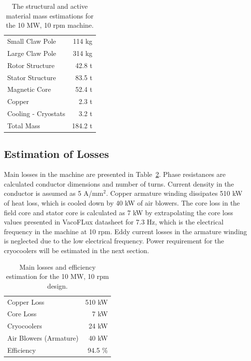 \documentclass[12pt]{iopart}
\begin{document}
\begin{table}
  \centering
  \begin{tabular}{lr}
\hline
Small Claw Pole & 114 kg \\
Large Claw Pole & 314 kg \\
\hline
Rotor Structure & 42.8 t \\
Stator Structure & 83.5 t \\
\hline
Magnetic Core & 52.4 t\\
Copper & 2.3 t\\
Cooling - Cryostats & 3.2 t \\
\hline
Total Mass & 184.2 t \\
\hline
 \end{tabular}
  \caption{The structural and active material mass estimations for the 10 MW, 10 rpm machine.}
  \label{10MW_total_mass}
\end{table}


\subsection{Estimation of Losses}

Main losses in the machine are presented in Table~\ref{10MW_efficiency}. Phase resistances are calculated conductor dimensions and number of turns. Current density in the conductor is assumed as 5 A/mm$^2$. Copper armature winding dissipates 510 kW of heat loss, which is cooled down by 40 kW of air blowers. The core loss in the field core and stator core is calculated
as 7 kW by extrapolating the core loss values presented in VacoFLux datasheet for 7.3 Hz, which is the electrical frequency in the machine at 10 rpm. Eddy current losses in the armature winding is neglected due to the low electrical frequency. Power requirement for the cryocoolers will be estimated in the next section.

\begin{table}[]
  \centering
  \begin{tabular}{lr}
\hline
Copper Loss & 510 kW \\
Core Loss & 7 kW \\
Cryocoolers & 24 kW \\
Air Blowers (Armature) & 40 kW \\
\hline
Efficiency & 94.5 \% \\
\hline
\end{tabular}
  \caption{Main losses and efficiency estimation for the 10 MW, 10 rpm design.}
  \label{10MW_efficiency}
\end{table}
\end{document}
